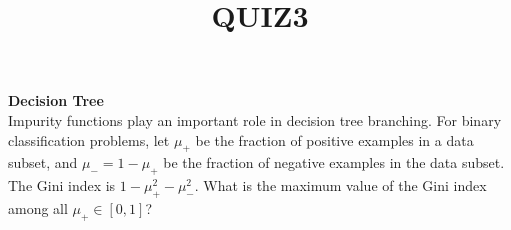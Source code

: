 \documentclass[a4paper,10pt]{exam}
\title{QUIZ3}
\date{}
\author{}
\begin{document}
	\maketitle
	\begin{questions}
		\question \textbf{Decision Tree}\\Impurity functions play an important role in decision tree branching. For binary classification problems, let $\mu_+$ be the fraction of positive examples in a data subset, and $\mu_- = 1 - \mu_+$ be the fraction of negative examples in the data subset.
		The Gini index is $1 - \mu_+^2 - \mu_-^2$. What is the maximum value of the Gini index among all $\mu_+ \in [0, 1]$?
		\begin{choices}
		\end{choices}
	\end{questions}
\end{document}
